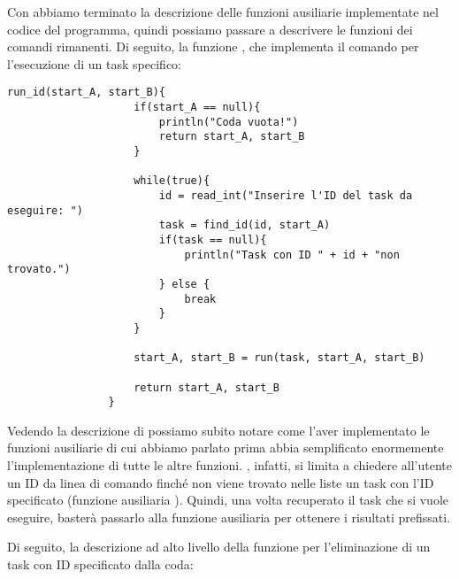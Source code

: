         Con  abbiamo terminato la descrizione delle funzioni ausiliarie implementate nel codice del programma, quindi possiamo passare a descrivere le funzioni dei comandi rimanenti. Di seguito, la funzione , che implementa il comando per l'esecuzione di un task specifico:
        
        \begin{center}
            \begin{lstlisting}[language=pseudo, gobble=14]
                run_id(start_A, start_B){
                    if(start_A == null){
                        println("Coda vuota!")
                        return start_A, start_B
                    }
                    
                    while(true){
                        id = read_int("Inserire l'ID del task da eseguire: ")
                        task = find_id(id, start_A)
                        if(task == null){
                            println("Task con ID " + id + "non trovato.")
                        } else {
                            break
                        }
                    }
                    
                    start_A, start_B = run(task, start_A, start_B)
                    
                    return start_A, start_B
                }\end{lstlisting}
        \end{center}
        
        Vedendo la descrizione di  possiamo subito notare come l'aver implementato le funzioni ausiliarie di cui abbiamo parlato prima abbia semplificato enormemente l'implementazione di tutte le altre funzioni. , infatti, si limita a chiedere all'utente un ID da linea di comando finché non viene trovato nelle liste un task con l'ID specificato (funzione ausiliaria ). Quindi, una volta recuperato il task che si vuole eseguire, basterà passarlo alla funzione ausiliaria  per ottenere i risultati prefissati.
        
        Di seguito, la descrizione ad alto livello della funzione per l'eliminazione di un task con ID specificato dalla coda:
        
